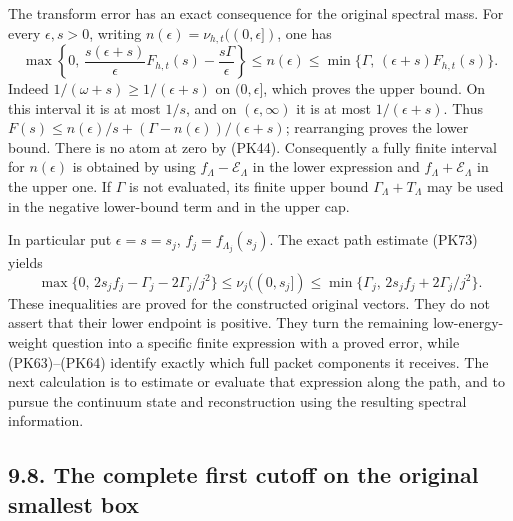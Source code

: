 \documentclass[11pt]{article}
\begin{document}
The transform error has an exact consequence for the original spectral
mass. For every \(\epsilon,s>0\), writing
\(n(\epsilon)=\nu_{h,t}((0,\epsilon])\), one has
\[
 \max\left\{0,\,
 \frac{s(\epsilon+s)}{\epsilon}F_{h,t}(s)
                 -\frac{s\Gamma}{\epsilon}\right\}
 \le n(\epsilon)\le
 \min\{\Gamma,\,(\epsilon+s)F_{h,t}(s)\}.
 \tag{PK74}
\]
Indeed \(1/(\omega+s)\ge1/(\epsilon+s)\) on \((0,\epsilon]\),
which proves the upper bound. On this interval it is at most \(1/s\),
and on \((\epsilon,\infty)\) it is at most \(1/(\epsilon+s)\).
Thus \(F(s)\le n(\epsilon)/s+
(\Gamma-n(\epsilon))/(\epsilon+s)\); rearranging proves the lower bound.
There is no atom at zero by (PK44).
Consequently a fully finite interval for \(n(\epsilon)\) is obtained by
using \(f_\Lambda-\mathcal E_\Lambda\) in the lower expression and
\(f_\Lambda+\mathcal E_\Lambda\) in the upper one. If \(\Gamma\) is
not evaluated, its finite upper bound \(\Gamma_\Lambda+T_\Lambda\)
may be used in the negative lower-bound term and in the upper cap.

In particular put \(\epsilon=s=s_j\), \(f_j=f_{\Lambda_j}(s_j)\).
The exact path estimate (PK73) yields
\[
 \max\{0,\,2s_jf_j-\Gamma_j-2\Gamma_j/j^2\}
 \le\nu_j((0,s_j])
 \le\min\{\Gamma_j,\,2s_jf_j+2\Gamma_j/j^2\}.
 \tag{PK75}
\]
These inequalities are proved for the constructed original vectors.
They do not assert that their lower endpoint is positive. They turn the
remaining low-energy-weight question into a specific finite expression
with a proved error, while (PK63)–(PK64) identify exactly which full
packet components it receives. The next calculation is to estimate or
evaluate that expression along the path, and to pursue the continuum
state and reconstruction using the resulting spectral information.

\subsection*{9.8. The complete first cutoff on the original smallest box}
\end{document}

